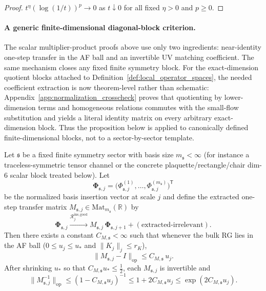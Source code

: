 \begin{proof}
$t^\eta (\log(1/t))^p\to 0$ as $t\downarrow0$ for all fixed $\eta>0$ and $p\ge 0$.
\end{proof}



\paragraph{A generic finite-dimensional diagonal-block criterion.}
The scalar multiplier-product proofs above use only two ingredients:
near-identity one-step transfer in the AF ball and an invertible UV matching coefficient.
The same mechanism closes any fixed finite symmetry block.
For the exact-dimension quotient blocks attached to Definition~\ref{def:local_operator_spaces}, the needed coefficient extraction is now theorem-level rather than schematic:
Appendix~\ref{app:normalization_crosscheck} proves that quotienting by lower-dimension terms and homogeneous relations commutes with the small-flow substitution and yields a literal identity matrix on every arbitrary exact-dimension block.
Thus the proposition below is applied to canonically defined finite-dimensional blocks, not to a sector-by-sector template.

\begin{proposition}\label{prop:block_mult_bound}
Let $\mathfrak s$ be a fixed finite symmetry sector with basis size $m_{\mathfrak s}<\infty$
(for instance a traceless-symmetric tensor channel or the concrete plaquette/rectangle/chair dim-$6$ scalar block treated below).
Let
\[
\mathbf\Phi_{\mathfrak s,j}
=
\bigl(\Phi_{\mathfrak s,j}^{(1)},\dots,\Phi_{\mathfrak s,j}^{(m_{\mathfrak s})}\bigr)^{\mathsf T}
\]
be the normalized basis insertion vector at scale $j$ and define the extracted one-step transfer matrix
$M_{\mathfrak s,j}\in \mathrm{Mat}_{m_{\mathfrak s}}(\mathbb R)$ by
\[
\mathbf\Phi_{\mathfrak s,j}
\xrightarrow{\mathcal R^{\mathrm{ins,good}}_j}
M_{\mathfrak s,j}\,\mathbf\Phi_{\mathfrak s,j+1}
+ (\text{extracted-irrelevant}).
\]
Then there exists a constant $C_{M,\mathfrak s}<\infty$ such that whenever the bulk RG lies in the AF ball
($0\le u_j\le u_\ast$ and $\|K_j\|_j\le r_K$),
\begin{equation}\label{eq:block_mult_near_identity}
\|M_{\mathfrak s,j}-I\|_{\mathrm{op}}\le C_{M,\mathfrak s}\,u_j.
\end{equation}
After shrinking $u_\ast$ so that $C_{M,\mathfrak s}u_\ast\le \tfrac12$, each $M_{\mathfrak s,j}$ is invertible and
\begin{equation}\label{eq:block_mult_inverse_bound}
\|M_{\mathfrak s,j}^{-1}\|_{\mathrm{op}}
\le (1-C_{M,\mathfrak s}u_j)^{-1}
\le 1+2C_{M,\mathfrak s}u_j
\le \exp(2C_{M,\mathfrak s}u_j).
\end{equation}
\end{proposition}

